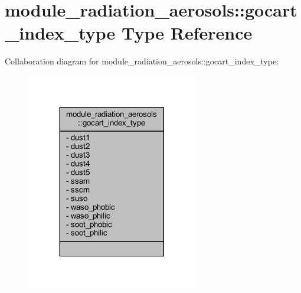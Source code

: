 \hypertarget{structmodule__radiation__aerosols_1_1gocart__index__type}{}\section{module\+\_\+radiation\+\_\+aerosols\+:\+:gocart\+\_\+index\+\_\+type Type Reference}
\label{structmodule__radiation__aerosols_1_1gocart__index__type}


Collaboration diagram for module\+\_\+radiation\+\_\+aerosols\+:\+:gocart\+\_\+index\+\_\+type\+:
\nopagebreak
\begin{figure}[H]
\begin{center}
\leavevmode
\includegraphics[width=212pt]{structmodule__radiation__aerosols_1_1gocart__index__type__coll__graph}
\end{center}
\end{figure}
